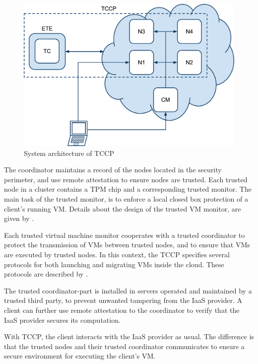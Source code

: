 \documentclass[pdftex,english,10pt,b5paper,twoside]{book}
\begin{document}
\begin{figure}[h!]
    \centering
    \includegraphics[scale=0.4]{ArchitectureTCCP.pdf}
    \caption{System architecture of TCCP}
    \label{fig:RW:TCCP}
\end{figure}

The coordinator maintains a record of the nodes located in the security
perimeter, and use remote attestation to ensure nodes are trusted. Each trusted
node in a cluster contains a \ac{TPM} chip and a corresponding trusted monitor.
The main task of the trusted monitor, is to enforce a local closed box
protection of a client's running \ac{VM}. Details about the design of the
trusted \ac{VM} monitor, are given by \citet{tccp}.

Each trusted virtual machine monitor cooperates with a trusted coordinator to
protect the transmission of \acp{VM} between trusted nodes, and to ensure that
\acp{VM} are executed by trusted nodes. In this context, the \ac{TCCP}
specifies several protocols for both launching and migrating \acp{VM} inside
the cloud. These protocols are described by \citet{tccp}.

The trusted coordinator-part is installed in servers operated and maintained by a
trusted third party, to prevent unwanted tampering from the \ac{IaaS} provider.
A client can further use remote attestation to the coordinator to verify that the
\ac{IaaS} provider secures its computation.

With \ac{TCCP}, the client interacts with the \ac{IaaS} provider as usual. The
difference is that the trusted nodes and their trusted coordinator communicates
to ensure a secure environment for executing the client's \ac{VM}.
\end{document}
